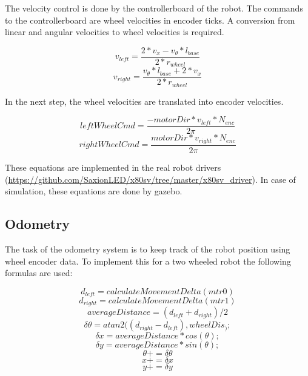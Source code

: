 \documentclass[a4paper]{article}
\begin{document}
The velocity control is done by the controllerboard of the robot. The commands to
the controllerboard are wheel velocities in encoder ticks. A conversion from linear
and angular velocities to wheel velocities is required.

\begin{equation}
        v_{left} = \frac{2 * v_{x} - v_{\theta} * l_{base}}{2 * r_{wheel}}
\end{equation}
\begin{equation}
        v_{right} = \frac{v_{\theta} * l_{base} + 2 * v_{x}}{2 * r_{wheel}}
\end{equation}

In the next step, the wheel velocities are translated into encoder velocities.

\begin{equation}
  leftWheelCmd = \frac{-motorDir * v_{left} * N_{enc}}{2 \pi}
\end{equation}
\begin{equation}
 rightWheelCmd = \frac{motorDir * v_{right} * N_{enc}}{2 \pi}
\end{equation}

These equations are implemented in the real robot drivers (\url{https://github.com/SaxionLED/x80sv/tree/master/x80sv_driver}). In case of simulation, these equations are done by gazebo.

\subsection{Odometry}
The task of the odometry system is to keep track of the robot position using wheel encoder
data. To implement this for a two wheeled robot the following formulas are used:

\begin{equation}
 d_{left} = calculateMovementDelta(mtr0)
\end{equation}
\begin{equation}
 d_{right} = calculateMovementDelta(mtr1)
\end{equation}
\begin{equation}
 averageDistance = (d_{left} + d_{right}) / 2
\end{equation}
\begin{equation}
 \delta \theta = atan2((d_{right} - d_{left}), wheelDis_);
\end{equation}
\begin{equation}
 \delta x = averageDistance * cos(\theta);
\end{equation}
\begin{equation}
 \delta y = averageDistance * sin(\theta);
\end{equation}
\begin{equation}
 \theta += \delta \theta
\end{equation}
\begin{equation}
 x += \delta x
\end{equation}
\begin{equation}
 y += \delta y
\end{equation}
\end{document}
